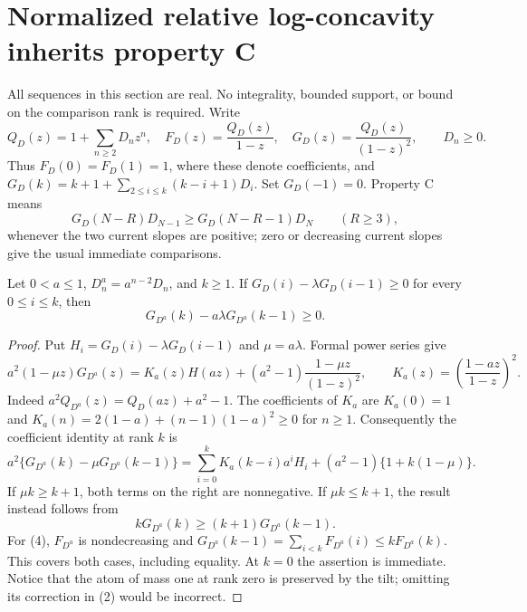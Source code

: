 \section{Normalized relative log-concavity inherits property C}
All sequences in this section are real.  No integrality, bounded support,
or bound on the comparison rank is required.  Write
\[
 Q_D(z)=1+\sum_{n\ge2}D_nz^n,\quad
 F_D(z)=\frac{Q_D(z)}{1-z},\quad G_D(z)=\frac{Q_D(z)}{(1-z)^2},
 \qquad D_n\ge0.
\]
Thus $F_D(0)=F_D(1)=1$, where these denote coefficients, and
$G_D(k)=k+1+\sum_{2\le i\le k}(k-i+1)D_i$.
Set $G_D(-1)=0$.  Property C means
\[
 G_D(N-R)D_{N-1}\ge G_D(N-R-1)D_N\qquad(R\ge3),             \tag{C}
\]
whenever the two current slopes are positive; zero or decreasing current
slopes give the usual immediate comparisons.

\begin{lemma}
Let $0<a\le1$, $D^{a}_n=a^{n-2}D_n$, and $k\ge1$.
If $G_D(i)-\lambda G_D(i-1)\ge0$ for every $0\le i\le k$, then
\[
                    G_{D^a}(k)-a\lambda G_{D^a}(k-1)\ge0. \tag{1}
\]
\end{lemma}
\begin{proof}
Put $H_i=G_D(i)-\lambda G_D(i-1)$ and $\mu=a\lambda$.
Formal power series give
\[
 a^2(1-\mu z)G_{D^a}(z)
 =K_a(z)H(az)+(a^2-1)\frac{1-\mu z}{(1-z)^2},\qquad
 K_a(z)=\left(\frac{1-az}{1-z}\right)^2.                    \tag{2}
\]
Indeed $a^2Q_{D^a}(z)=Q_D(az)+a^2-1$.  The coefficients of
$K_a$ are $K_a(0)=1$ and
$K_a(n)=2(1-a)+(n-1)(1-a)^2\ge0$ for $n\ge1$.
Consequently the coefficient identity at rank $k$ is
\[
 a^2\{G_{D^a}(k)-\mu G_{D^a}(k-1)\}
 =\sum_{i=0}^kK_a(k-i)a^iH_i
       +(a^2-1)\{1+k(1-\mu)\}.                           \tag{3}
\]
If $\mu k\ge k+1$, both terms on the right are nonnegative.
If $\mu k\le k+1$, the result instead follows from
\[
                kG_{D^a}(k)\ge(k+1)G_{D^a}(k-1).          \tag{4}
\]
For (4), $F_{D^a}$ is nondecreasing and
$G_{D^a}(k-1)=\sum_{i<k}F_{D^a}(i)\le kF_{D^a}(k)$.
This covers both cases, including equality.  At $k=0$ the assertion
is immediate.  Notice that the atom of mass one at rank zero is
preserved by the tilt; omitting its correction in (2) would be incorrect.
\end{proof}

